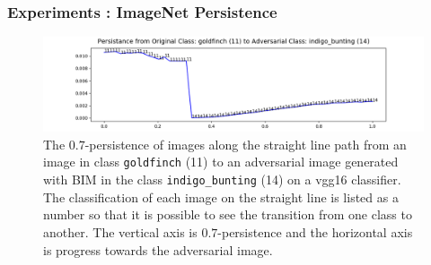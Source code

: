 \begin{frame}
  \frametitle{Experiments : ImageNet Persistence}
 \begin{figure}[ht]
 \centering
 \includegraphics[width = \textwidth]
 {c3_figures/persistence_interpolation-IMNET-class-11-vgg16-BIM-48-attack_data-001.png}
 \caption{The $0.7$-persistence of images along the straight line path from an image in class \texttt{goldfinch} (11) to an adversarial image generated with BIM in the class \texttt{indigo\_bunting} (14) on a vgg16 classifier. The classification of each image on the straight line is listed as a number so that it is possible to see the transition from one class to another. The vertical axis is $0.7$-persistence and the horizontal axis is progress towards the adversarial image.}\label{fig:persistent_interpimage}
 \end{figure}
\end{frame}

